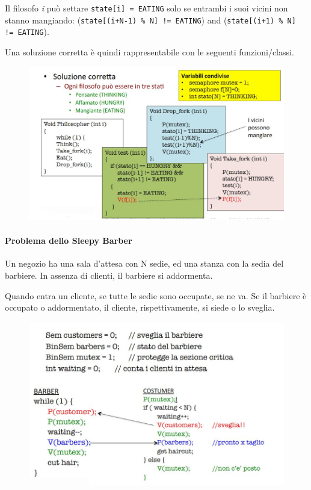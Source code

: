 \documentclass[a4paper]{article}
\begin{document}
Il filosofo \textit{i} può settare \texttt{state[i] = EATING} solo se entrambi i suoi vicini non stanno mangiando: (\texttt{state[(i+N-1) \% N] != EATING}) and (\texttt{state[(i+1) \% N] != EATING}).

Una soluzione corretta è quindi rappresentabile con le seguenti funzioni/classi.
\begin{figure}[htb]
    \includegraphics[width=\linewidth]{img/filosofi_ok.JPG}
\end{figure}

\paragraph{Problema dello Sleepy Barber}
Un negozio ha una sala d'attesa con N sedie, ed una stanza con la sedia del barbiere. In assenza di clienti, il barbiere si addormenta.

Quando entra un cliente, se tutte le sedie sono occupate, se ne va. Se il barbiere è occupato o addormentato, il cliente, rispettivamente, si siede o lo sveglia.
\begin{figure}[htb]
    \includegraphics[width=\linewidth]{img/barber.JPG}
\end{figure}
\end{document}
